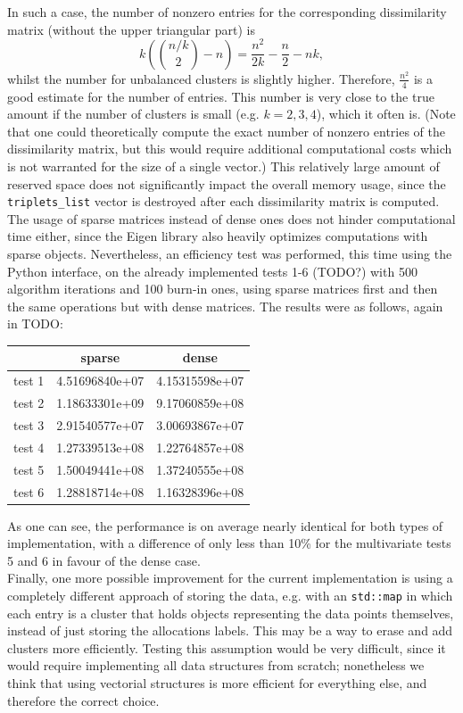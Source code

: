 In such a case, the number of nonzero entries for the corresponding dissimilarity matrix (without the upper triangular part) is
$$ k \left(\binom{n/k}{2} - n\right) = \frac{n^2}{2k} -\frac{n}{2} - nk,$$
whilst the number for unbalanced clusters is slightly higher.
Therefore, $\frac{n^2}{4}$ is a good estimate for the number of entries.
This number is very close to the true amount if the number of clusters is small (e.g. $k=2,3,4$), which it often is. (Note that one could theoretically compute the exact number of nonzero entries of the dissimilarity matrix, but this would require additional computational costs which is not warranted for the size of a single vector.)
This relatively large amount of reserved space does not significantly impact the overall memory usage, since the \verb|triplets_list| vector is destroyed after each dissimilarity matrix is computed. \\
The usage of sparse matrices instead of dense ones does not hinder computational time either, since the Eigen library also heavily optimizes computations with sparse objects.
Nevertheless, an efficiency test was performed, this time using the Python interface, on the already implemented tests 1-6 (TODO?) with 500 algorithm iterations and 100 burn-in ones, using sparse matrices first and then the same operations but with dense matrices.
The results were as follows, again in TODO:
\begin{center}
	\begin{tabular}{c|c|c}
       &      sparse    &      dense     \\ \hline
test 1 & 4.51696840e+07 & 4.15315598e+07 \\
test 2 & 1.18633301e+09 & 9.17060859e+08 \\
test 3 & 2.91540577e+07 & 3.00693867e+07 \\
test 4 & 1.27339513e+08 & 1.22764857e+08 \\
test 5 & 1.50049441e+08 & 1.37240555e+08 \\
test 6 & 1.28818714e+08 & 1.16328396e+08
	\end{tabular}
\end{center}
As one can see, the performance is on average nearly identical for both types of implementation, with a difference of only less than 10\% for the multivariate tests 5 and 6 in favour of the dense case. \\[8pt]
Finally, one more possible improvement for the current implementation is using a completely different approach of storing the data, e.g. with an \verb|std::map| in which each entry is a cluster that holds objects representing the data points themselves, instead of just storing the allocations labels.
This may be a way to erase and add clusters more efficiently.
Testing this assumption would be very difficult, since it would require implementing all data structures from scratch; nonetheless we think that using vectorial structures is more efficient for everything else, and therefore the correct choice.


